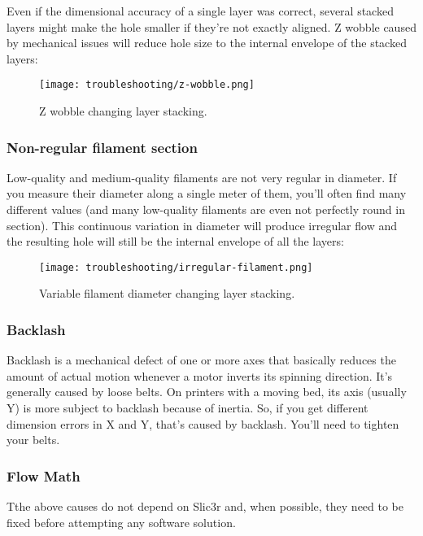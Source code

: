Even if the dimensional accuracy of a single layer was correct, several stacked layers might make the hole smaller if they're not exactly aligned. Z wobble caused by mechanical issues will reduce hole size to the internal envelope of the stacked layers:

\begin{figure}[H]
\centering
\texttt{[image: troubleshooting/z-wobble.png]}
\caption{Z wobble changing layer stacking.}
\label{fig:z-wobble}
\end{figure}

\subsubsection{Non-regular filament section}

Low-quality and medium-quality filaments are not very regular in diameter. If you measure their diameter along a single meter of them, you'll often find many different values (and many low-quality filaments are even not perfectly round in section). This continuous variation in diameter will produce irregular flow and the resulting hole will still be the internal envelope of all the layers:

\begin{figure}[H]
\centering
\texttt{[image: troubleshooting/irregular-filament.png]}
\caption{Variable filament diameter changing layer stacking.}
\label{fig:irregular-filament}
\end{figure}

\subsubsection{Backlash}

Backlash is a mechanical defect of one or more axes that basically reduces the amount of actual motion whenever a motor inverts its spinning direction. It's generally caused by loose belts. On printers with a moving bed, its axis (usually Y) is more subject to backlash because of inertia. So, if you get different dimension errors in X and Y, that's caused by backlash. You'll need to tighten your belts.

\subsubsection{Flow Math}
Tthe above causes do not depend on Slic3r and, when possible, they need to be fixed before attempting any software solution.

